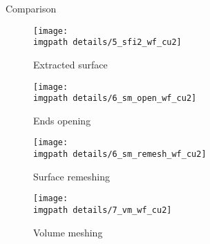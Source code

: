 
\newcommand{\figpart}{.35}
\newcommand{\hpart}{.35}

\begin{frame}{Comparison}
\begin{center}
 \begin{figure}[H]
	\begin{minipage}[t]{\figpart \linewidth}
            	\centering
            	\texttt{[image: \\imgpath details/5\_sfi2\_wf\_cu2]}
		\caption*{Extracted surface}
	\end{minipage}
	\begin{minipage}[t]{\figpart \linewidth}
            	\centering
            	\texttt{[image: \\imgpath details/6\_sm\_open\_wf\_cu2]}
		\caption*{Ends opening}
	\end{minipage}
	\begin{minipage}[t]{\figpart \linewidth}
            	\centering
            	\texttt{[image: \\imgpath details/6\_sm\_remesh\_wf\_cu2]}
		\caption*{Surface remeshing}
	\end{minipage}
	\begin{minipage}[t]{\figpart \linewidth}
            	\centering
            	\texttt{[image: \\imgpath details/7\_vm\_wf\_cu2]}
		\caption*{Volume meshing}
	\end{minipage}
 \end{figure}
\end{center}
\end{frame}

